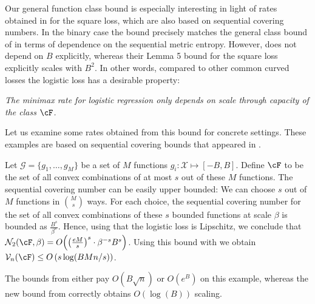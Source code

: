 Our general function class bound is especially interesting in light of rates obtained in \cite{RakSri14a} for the square loss, which are also based on sequential covering numbers. In the binary case the bound  precisely matches the general class bound of \cite[Lemma 5]{RakSri14a} in terms of dependence on the sequential metric entropy. However,  does not depend on $B$ explicitly, whereas their Lemma 5 bound for the  square loss explicitly scales with $B^{2}$. In other words, compared to other common curved losses the logistic loss has a desirable property:
\begin{center}\emph{The minimax rate for logistic regression only depends on scale through capacity of the class $\cF$.}\end{center}

Let us examine some rates obtained from this bound for concrete settings. These examples are based on sequential covering bounds that appeared in \cite{RakSri14a,RakSri15}.

\begin{example}
Let $\mathcal{G} = \{g_1,\ldots, g_M \}$ be a set of $M$ functions $g_i:\mathcal{X} \mapsto [-B,B]$. Define $\F$ to be the set of all convex combinations of at most $s$ out of these $M$ functions.  The sequential covering number can be easily upper bounded: We can choose $s$ out of $M$ functions in ${M \choose s}$ ways. For each choice, the sequential covering number for the set of all convex combinations of these $s$ bounded functions at scale $\beta$ is bounded as $\frac{B^s}{\beta^s}$. Hence, using that the logistic loss is Lipschitz, we conclude that $\mathcal{N}_2(\F,\beta) = O\prn*{\left(\frac{e M}{s}\right)^s \cdot \beta^{-s } B^s}$. Using this bound with  we obtain $\mathcal{V}_n(\F) \le O\left(s \log(BMn/s)\right)$.
\end{example}
The bounds from \cite{RakSriTew14jmlr, RakSri14a,RakSri15} either pay $O(B\sqrt{n})$ or $O(e^{B})$ on this example, whereas the new bound from  correctly obtains $O(\log(B))$ scaling.

